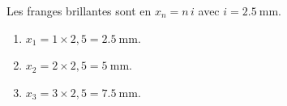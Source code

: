 \documentclass[11pt,a4paper]{article}
\begin{document}
\begin{corrige}
Les franges brillantes sont en $x_n=n\,i$ avec $i=\SI{2.5}{\milli\metre}$.
\begin{enumerate}[label=\alph*)]
  \item $x_1=1\times 2{,}5=\SI{2.5}{\milli\metre}.$
  \item $x_2=2\times 2{,}5=\SI{5}{\milli\metre}.$
  \item $x_3=3\times 2{,}5=\SI{7.5}{\milli\metre}.$
\end{enumerate}
\end{corrige}
\end{document}
